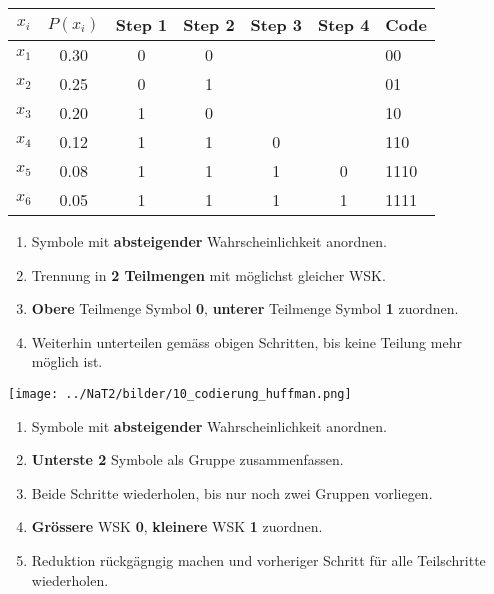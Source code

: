 \begin{multicols}{2}
	\begin{tabular}{|c|c|c|c|c|c|l|}
		\hline
		$x_i$	& $P(x_i)$ 	& Step 1	& Step 2	& Step 3 	& Step 4 	& Code \\
		\hline
		$x_1$	& 0.30		& 0			& 0			& 			&			& 00 \\
		\cline{4-4}
		$x_2$	& 0.25		& 0			& 1			& 			& 			& 01 \\
		\cline{3-4}
		$x_3$	& 0.20		& 1			& 0			& 			& 			& 10 \\
		\cline{4-5}
		$x_4$	& 0.12		& 1			& 1			& 0			& 			& 110 \\
		\cline{5-6}
		$x_5$	& 0.08		& 1			& 1			& 1			& 0			& 1110 \\
		\cline{6-6}		
		$x_6$	& 0.05		& 1			& 1			& 1			& 1			& 1111 \\
		\hline 
	\end{tabular}
	
	\begin{enumerate}
		\item Symbole mit \textbf{absteigender} Wahrscheinlichkeit anordnen.
		\item Trennung in \textbf{2 Teilmengen} mit möglichst gleicher WSK.
		\item \textbf{Obere} Teilmenge Symbol \textbf{0}, \textbf{unterer} Teilmenge Symbol \textbf{1}
		  zuordnen.
		\item Weiterhin unterteilen gemäss obigen Schritten, bis keine Teilung mehr möglich ist.
	\end{enumerate}
\end{multicols}



\begin{minipage}{8cm}
	\begin{center}
	\texttt{[image: ../NaT2/bilder/10\_codierung\_huffman.png]}
	\end{center}
\end{minipage}
\begin{minipage}{11cm}
	\begin{enumerate}
	  \item Symbole mit \textbf{absteigender} Wahrscheinlichkeit anordnen.
	  \item \textbf{Unterste 2} Symbole als Gruppe zusammenfassen.
	  \item Beide Schritte wiederholen, bis nur noch zwei Gruppen vorliegen.
	  \item \textbf{Grössere} WSK \textbf{0}, \textbf{kleinere} WSK \textbf{1} zuordnen.
	  \item Reduktion rückgägngig machen und vorheriger Schritt für alle Teilschritte wiederholen.
	\end{enumerate}
\end{minipage}
